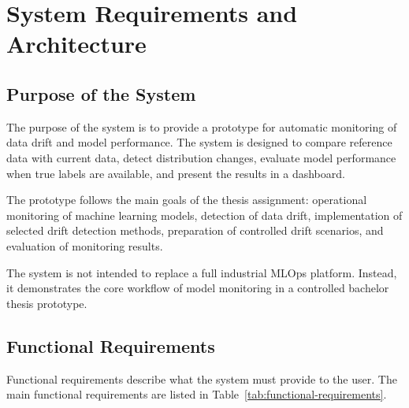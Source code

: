 \chapter{System Requirements and Architecture}
\label{ch:system-requirements-architecture}

\section{Purpose of the System}

The purpose of the system is to provide a prototype for automatic monitoring of data drift and model performance. The system is designed to compare reference data with current data, detect distribution changes, evaluate model performance when true labels are available, and present the results in a dashboard.

The prototype follows the main goals of the thesis assignment: operational monitoring of machine learning models, detection of data drift, implementation of selected drift detection methods, preparation of controlled drift scenarios, and evaluation of monitoring results. \cite{MonitoringPerformance}

The system is not intended to replace a full industrial MLOps platform. Instead, it demonstrates the core workflow of model monitoring in a controlled bachelor thesis prototype.

\section{Functional Requirements}

Functional requirements describe what the system must provide to the user. The main functional requirements are listed in Table~\ref{tab:functional-requirements}.

